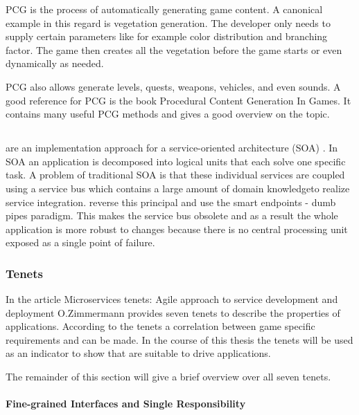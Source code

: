 PCG is the process of automatically generating game content. A canonical
example in this regard is vegetation generation. The developer only needs to
supply certain parameters like for example color distribution and branching
factor. The game then creates all the vegetation before the game starts or even
dynamically as needed.

PCG also allows generate levels, quests, weapons, vehicles, and even sounds. A
good reference for PCG is the book Procedural Content Generation In
Games\cite{shaker2014procedural}. It contains many useful PCG methods and gives
a good overview on the topic.

\subsection{\mss{}}

\mss{} are an implementation approach for a service-oriented architecture (SOA)
\cite{zimmermann2016microservices}. In SOA an application is decomposed into
logical units that each solve one specific task. A problem of traditional SOA is
that these individual services are coupled using a service bus which contains a
large amount of domain knowledgeto realize service integration. \mss{} reverse
this principal and use the smart endpoints - dumb pipes paradigm. This makes the
service bus obsolete and as a result the whole application is more robust to
changes because there is no central processing unit exposed as a single point of
failure.

\subsubsection{\ms{} Tenets}

In the article Microservices tenets: Agile approach to service development and
deployment O.Zimmermann provides seven \ms{} tenets to describe the properties
of \ms{} applications. According to the tenets a correlation between game
specific requirements and \ogs{} can be made. In the course of this thesis the
\ms{} tenets will be used as an indicator to show that \mss{} are suitable to
drive \og{} applications.

The remainder of this section will give a brief overview over all seven tenets.

\paragraph{Fine-grained Interfaces and Single Responsibility}

